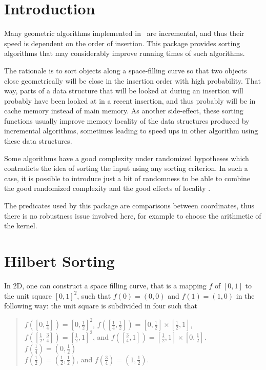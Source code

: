 
\section{Introduction}

Many geometric algorithms implemented in \cgal\ are incremental, and thus their
speed is dependent on the order of insertion.  This package provides sorting
algorithms that may considerably improve running times of such
algorithms.

The rationale is to sort objects along a space-filling curve 
so that two
objects close geometrically will be close in the insertion order with high
probability.  That way, parts of a data structure that will be looked at during
an insertion will probably have been looked at in a recent insertion, and thus
probably will be in cache memory instead of main memory.
As another side-effect, these sorting functions usually improve memory locality
of the data structures produced by incremental algorithms, sometimes leading to
speed ups in other algorithm using these data structures.

Some algorithms have a good complexity under randomized hypotheses which
contradicts the idea of sorting the input using any sorting criterion.
In such a case, it is possible to introduce just a bit of randomness 
to be able to combine the good randomized complexity and the
good effects of locality \cite{acr-icb-03}.


The predicates used by this package are comparisons between coordinates,
thus there is no robustness issue involved here, for example to choose the
arithmetic of the kernel.


\section{Hilbert Sorting\label{sec:hilbert_sorting}}


In 2D, one can construct a space filling curve, that is a mapping $f$ of $[0,1]$
to the unit square $[0,1]^2$, such that $f(0)=(0,0)$ and $f(1)=(1,0)$ 
 in the following way:
the unit square is subdivided in four such that\\
\begin{quote}
$f([0,\frac{1}{4}])=[0,\frac{1}{2}]^2$, 
$f([\frac{1}{4},\frac{1}{2}])=[0,\frac{1}{2}]\times[\frac{1}{2},1]$,
$f([\frac{1}{2},\frac{3}{4}])=[\frac{1}{2},1]^2$,
and 
$f([\frac{3}{4},1])=[\frac{1}{2},1]\times[0,\frac{1}{2}].$\\
$f(\frac{1}{4})=(0,\frac{1}{2})$\\
$f(\frac{1}{2})=(\frac{1}{2},\frac{1}{2})$, and
$f(\frac{3}{4})=(1,\frac{1}{2})$.
\end{quote}


